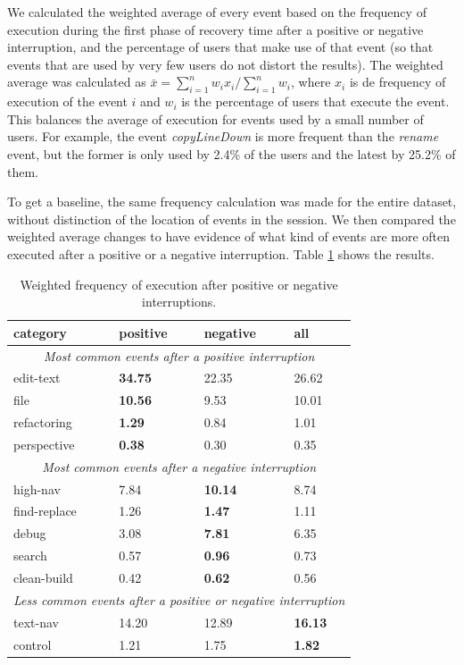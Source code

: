 \documentclass[times]{smrauth}
\begin{document}
We calculated the weighted average of every event based on the frequency of execution during the first phase of recovery time after a positive or negative interruption, and the percentage of users that make use of that event (so that events that are used by very few users do not distort the results). The weighted average was calculated as $\bar{x} = \sum_{i=1}^{n}w_ix_i / \sum_{i=1}^{n}w_i$, where $x_i$ is de frequency of execution of the event $i$ and $w_i$ is the percentage of users that execute the event. This balances the average of execution for events used by a small number of users. For example, the event \textit{copyLineDown} is more frequent than the \textit{rename} event, but the former is only used by 2.4\% of the users and the latest by 25.2\% of them.

To get a baseline, the same frequency calculation was made for the entire dataset, without distinction of the location of events in the session. We then compared the weighted average changes to have evidence of what kind of events are more often executed after a positive or a negative interruption. Table \ref{tbl:stats_events} shows the results.

\begin{table}[ht!]
\tiny
\renewcommand{\arraystretch}{1.3}
\caption{Weighted frequency of execution after positive or negative interruptions. }
\label{tbl:stats_events}
\centering
\begin{tabular}{|p{2cm}|p{1cm} |p{1cm}|p{1cm}|} 
  \hline 
category & positive & negative & all \\  
  \hline 
\multicolumn{4}{c}{\textit{Most common events after a positive interruption}} \\
    \hline 
edit-text &  \textbf{34.75} & 22.35 & 26.62 \\
file &  \textbf{10.56} & 9.53 & 10.01\\
refactoring & \textbf{1.29} & 0.84 & 1.01 \\
perspective & \textbf{0.38} & 0.30 & 0.35  \\
    \hline 
\multicolumn{4}{c}{\textit{Most common events after a negative interruption}} \\
    \hline 
high-nav & 7.84 & \textbf{10.14} & 8.74  \\
find-replace & 1.26 & \textbf{1.47} & 1.11 \\
debug & 3.08 & \textbf{7.81} & 6.35  \\
search & 0.57 & \textbf{0.96} & 0.73 \\
clean-build & 0.42 & \textbf{0.62} & 0.56  \\
    \hline 
\multicolumn{4}{c}{\textit{Less common events after a positive or negative interruption}} \\
    \hline 
text-nav & 14.20 & 12.89 & \textbf{16.13} \\
control & 1.21 & 1.75 & \textbf{1.82} \\
\hline
\end{tabular}
\end{table}
\end{document}
